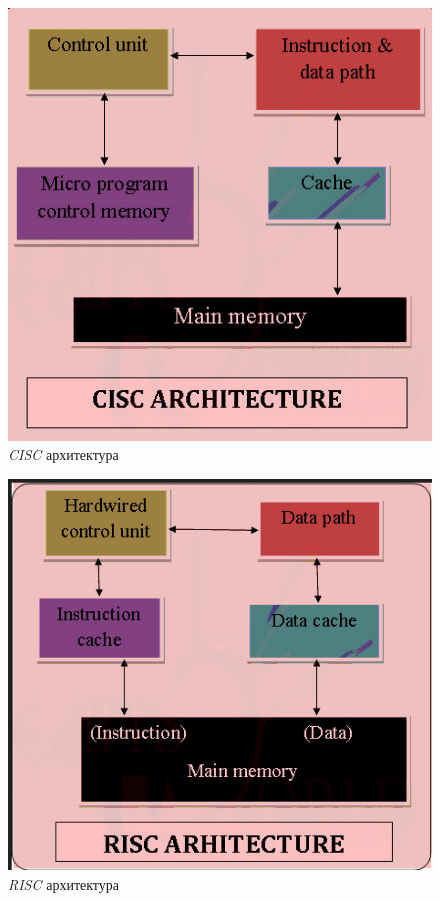\documentclass[12pt,oneside]{memoir}
\begin{document}
\begin{figure}[h!]
\begin{center}
\includegraphics[scale=0.75]{slika22.jpg}
\end{center}
\caption{\textit{CISC} архитектура}
\label{fig:main}
\end{figure}

\begin{figure}[h!]
\begin{center}
\includegraphics[scale=0.75]{slika23.jpg}
\end{center}
\caption{\textit{RISC} архитектура}
\label{fig:main}
\end{figure}
\end{document}
